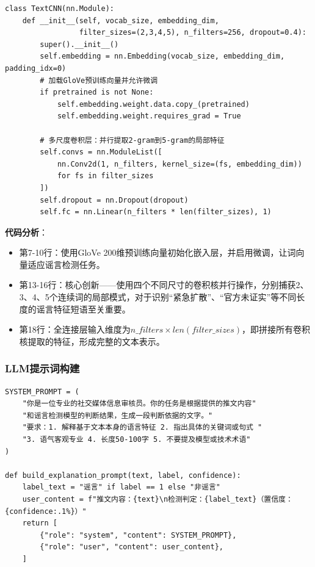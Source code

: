 \documentclass[12pt,a4paper]{article}
\begin{document}
\begin{lstlisting}[caption={TextCNN模型核心代码}, label={lst:textcnn}]
class TextCNN(nn.Module):
    def __init__(self, vocab_size, embedding_dim, 
                 filter_sizes=(2,3,4,5), n_filters=256, dropout=0.4):
        super().__init__()
        self.embedding = nn.Embedding(vocab_size, embedding_dim, padding_idx=0)
        # 加载GloVe预训练向量并允许微调
        if pretrained is not None:
            self.embedding.weight.data.copy_(pretrained)
            self.embedding.weight.requires_grad = True
        
        # 多尺度卷积层：并行提取2-gram到5-gram的局部特征
        self.convs = nn.ModuleList([
            nn.Conv2d(1, n_filters, kernel_size=(fs, embedding_dim))
            for fs in filter_sizes
        ])
        self.dropout = nn.Dropout(dropout)
        self.fc = nn.Linear(n_filters * len(filter_sizes), 1)
\end{lstlisting}

\textbf{代码分析}：
\begin{itemize}
    \item 第7-10行：使用GloVe 200维预训练向量初始化嵌入层，并启用微调，让词向量适应谣言检测任务。
    \item 第13-16行：核心创新——使用四个不同尺寸的卷积核并行操作，分别捕获2、3、4、5个连续词的局部模式，对于识别“紧急扩散”、“官方未证实”等不同长度的谣言特征短语至关重要。
    \item 第18行：全连接层输入维度为$n\_filters \times len(filter\_sizes)$，即拼接所有卷积核提取的特征，形成完整的文本表示。
\end{itemize}

\subsubsection{LLM提示词构建}

\begin{lstlisting}[caption={LLM提示词构建代码}, label={lst:prompt}]
SYSTEM_PROMPT = (
    "你是一位专业的社交媒体信息审核员。你的任务是根据提供的推文内容"
    "和谣言检测模型的判断结果，生成一段判断依据的文字。"
    "要求：1. 解释基于文本本身的语言特征 2. 指出具体的关键词或句式 "
    "3. 语气客观专业 4. 长度50-100字 5. 不要提及模型或技术术语"
)

def build_explanation_prompt(text, label, confidence):
    label_text = "谣言" if label == 1 else "非谣言"
    user_content = f"推文内容：{text}\n检测判定：{label_text}（置信度：{confidence:.1%}）"
    return [
        {"role": "system", "content": SYSTEM_PROMPT},
        {"role": "user", "content": user_content},
    ]
\end{lstlisting}
\end{document}
